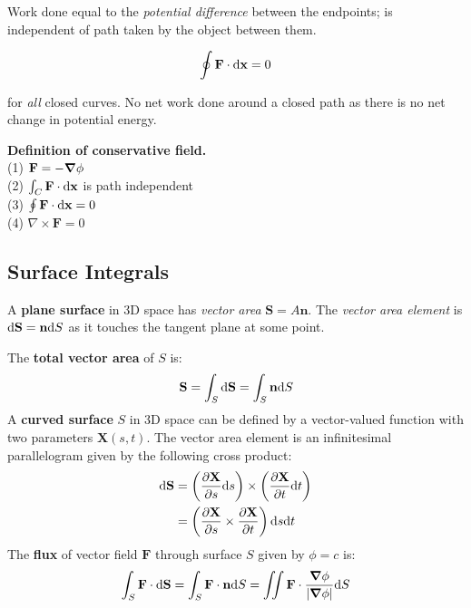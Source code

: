  Work done equal to the \textit{potential difference} between the endpoints; is independent of path taken by the object between them. 
 
 $$\oint \mathbf{F} \cdot \differential \mathbf{x} = 0$$
 
 for \textit{all} closed curves. No net work done around a closed path as there is no net change in potential energy.
 
 \textbf{Definition of conservative field.} \\
 (1) $\mathbf{F} = -\grad \phi$ \\
 (2) $\int_C \mathbf{F} \cdot \differential \mathbf{x}$ is path independent \\
 (3) $\oint \mathbf{F} \cdot \differential \mathbf{x} = 0$ \\
 (4) $\nabla \times \mathbf{F} = 0$

\subsection*{Surface Integrals}

A \textbf{plane surface} in 3D space has \textit{vector area} $\mathbf{S} = A \mathbf{n}$. The \textit{vector area element} is $\differential \mathbf{S} = \mathbf{n} \differential S$ as it touches the tangent plane at some point.

The \textbf{total vector area} of $S$ is:
\begin{equation*}
    \mathbf{S} = \int_{S} \differential \mathbf{S} = \int_{S} \mathbf{n} \differential S
\end{equation*}
A \textbf{curved surface} $S$ in 3D space can be defined by a vector-valued function with two parameters $\mathbf{X}(s,t)$. The vector area element is an infinitesimal parallelogram given by the following cross product:
\begin{equation*}
    \begin{aligned}
    \differential \mathbf{S} &= \left(\pdv{\mathbf{X}}{s} \differential s\right) \times \left(\pdv{\mathbf{X}}{t} \differential t\right) \\
    &= \left(\pdv{\mathbf{X}}{s} \times \pdv{\mathbf{X}}{t} \right) \differential s \differential t
    \end{aligned}
\end{equation*}
The \textbf{flux} of vector field $\mathbf{F}$ through surface $S$ given by $\phi = c$ is:
\begin{equation*}
    \int_{S} \mathbf{F} \cdot \differential \mathbf{S} = \int_{S} \mathbf{F} \cdot \mathbf{n} \differential S = \iint \mathbf{F} \cdot \frac{\grad \phi}{|\grad \phi|} \differential S
\end{equation*}

